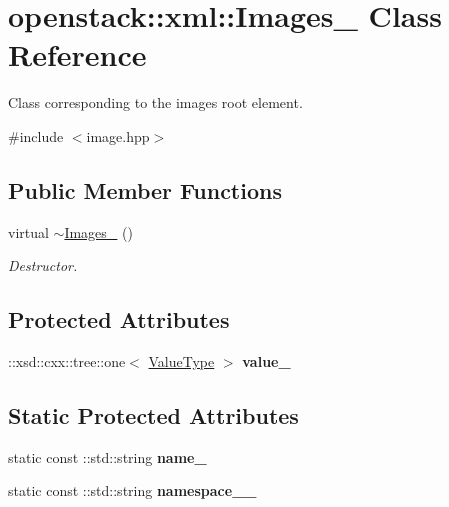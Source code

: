 \hypertarget{classopenstack_1_1xml_1_1Images__}{
\section{openstack::xml::Images\_\- Class Reference}
\label{classopenstack_1_1xml_1_1Images__}
}


Class corresponding to the images root element.  




{\ttfamily \#include $<$image.hpp$>$}

\subsection*{Public Member Functions}
\begin{DoxyCompactItemize}
\item 
\hypertarget{classopenstack_1_1xml_1_1Images___ab9dfc4122338b8b9bba4ee6569283e03}{
virtual \hyperlink{classopenstack_1_1xml_1_1Images___ab9dfc4122338b8b9bba4ee6569283e03}{$\sim$Images\_\-} ()}
\label{classopenstack_1_1xml_1_1Images___ab9dfc4122338b8b9bba4ee6569283e03}

\begin{DoxyCompactList}\small\item\em Destructor. \item\end{DoxyCompactList}\end{DoxyCompactItemize}
\subsection*{Protected Attributes}
\begin{DoxyCompactItemize}
\item 
\hypertarget{classopenstack_1_1xml_1_1Images___a2574d932d3958d7a293352bcac3a88e3}{
::xsd::cxx::tree::one$<$ \hyperlink{classopenstack_1_1xml_1_1Images}{ValueType} $>$ {\bfseries value\_\-}}
\label{classopenstack_1_1xml_1_1Images___a2574d932d3958d7a293352bcac3a88e3}

\end{DoxyCompactItemize}
\subsection*{Static Protected Attributes}
\begin{DoxyCompactItemize}
\item 
\hypertarget{classopenstack_1_1xml_1_1Images___aa3eb812e3ece9985a3be3c9f84881408}{
static const ::std::string {\bfseries name\_\-}}
\label{classopenstack_1_1xml_1_1Images___aa3eb812e3ece9985a3be3c9f84881408}

\item 
\hypertarget{classopenstack_1_1xml_1_1Images___aa7b63246c565c936f1999a83e1be3a80}{
static const ::std::string {\bfseries namespace\_\-\_\-}}
\label{classopenstack_1_1xml_1_1Images___aa7b63246c565c936f1999a83e1be3a80}

\end{DoxyCompactItemize}
